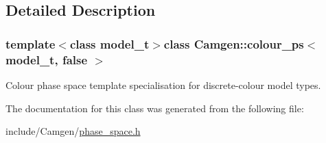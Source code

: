 \subsection{Detailed Description}
\subsubsection*{template$<$class model\-\_\-t$>$class Camgen\-::colour\-\_\-ps$<$ model\-\_\-t, false $>$}

Colour phase space template specialisation for discrete-\/colour model types. 



The documentation for this class was generated from the following file\-:\begin{DoxyCompactItemize}
\item 
include/\-Camgen/\hyperlink{a00694}{phase\-\_\-space.\-h}\end{DoxyCompactItemize}

